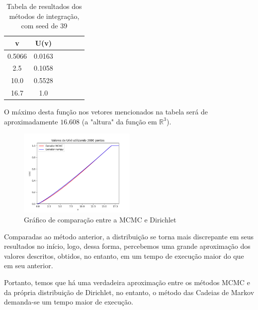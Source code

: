 \documentclass[a4paper]{article}
\begin{document}
\begin{table}[h]
\centering
\begin{tabular}{|c|c|c|c|c|c|}
\hline
v & U(v)  \\
\hline
0.5066 & 0.0163 \\
\hline
2.5 & 0.1058 \\
\hline
10.0 & 0.5528 \\
\hline
16.7 & 1.0 \\
\hline
\end{tabular}
\caption{Tabela de resultados dos métodos de integração, com seed de 39}
\label{tab:resultados}
\end{table}

O máximo desta função nos vetores mencionados na tabela será de aproximadamente $16.608$ (a "altura" da função em $\mathbb{R}^3$).

\begin{figure}[H]
  \centering
  \includegraphics[width=0.5\textwidth]{Geradores.png}
  \caption{Gráfico de comparação entre a MCMC e Dirichlet}
  \label{fig:HxU}
\end{figure}

Comparadas ao método anterior, a distribuição se torna mais discrepante em seus resultados no início, logo, dessa forma, percebemos uma grande aproximação dos valores descritos, obtidos, no entanto, em um tempo de execução maior do que em seu anterior.

Portanto, temos que há uma verdadeira aproximação entre os métodos MCMC e da própria distribuição de Dirichlet, no entanto, o método das Cadeias de Markov demanda-se um tempo maior de execução.
\end{document}
